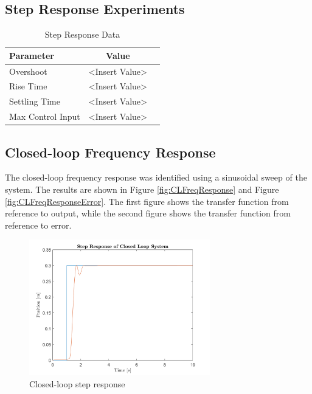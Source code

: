 \documentclass[11pt]{article}
\begin{document}
\subsection{Step Response Experiments}
\begin{table}[h!]
    \centering
    \begin{tabular}{@{}lcc@{}}
    \toprule
    \textbf{Parameter} & \textbf{Value} \\
    \midrule
    Overshoot & <Insert Value> \\
    Rise Time & <Insert Value> \\
    Settling Time & <Insert Value> \\
    Max Control Input & <Insert Value> \\
    \bottomrule
    \end{tabular}
    \caption{Step Response Data}
    \label{tab:step_response}
\end{table}
    




\subsection{Closed-loop Frequency Response}
The closed-loop frequency response was identified using a sinusoidal sweep of the system. The results are shown in Figure \ref{fig:CLFreqResponse} and Figure \ref{fig:CLFreqResponseError}. The first figure shows the transfer function from reference to output, while the second figure shows the transfer function from reference to error.

\begin{figure}[!ht]
\centering
\includegraphics[width=0.7\textwidth]{CLStepResponse.png}
\caption{Closed-loop step response}
\label{fig:CLStepResponse}
\end{figure}
\end{document}

